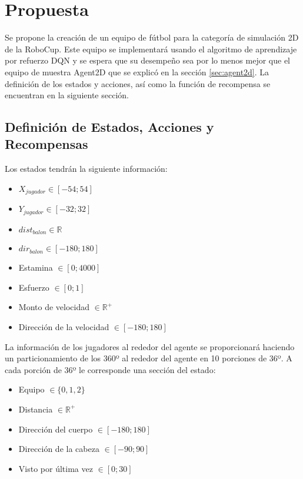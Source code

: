 \chapter{Propuesta}

Se propone la creación de un equipo de fútbol para la categoría de simulación 2D de la RoboCup. Este equipo se implementará usando el algoritmo de aprendizaje por refuerzo \ac{DQN} y se espera que su desempeño sea por lo menos mejor que el equipo de muestra Agent2D que se explicó en la sección \ref{sec:agent2d}. La definición de los estados y acciones, así como la función de recompensa se encuentran en la siguiente sección.

\section{Definición de Estados, Acciones y Recompensas}

Los estados tendrán la siguiente información:

\begin{itemize}
\item $X_{jugador} \in [-54; 54]$ 
\item $Y_{jugador} \in [-32; 32]$
\item $dist_{balon} \in \mathbb{R}$
\item $dir_{balon} \in [-180; 180]$
\item Estamina $ \in [0; 4000]$
\item Esfuerzo $ \in [0; 1]$
\item Monto de velocidad $ \in \mathbb{R}^+$
\item Dirección de la velocidad $ \in [-180; 180]$
\end{itemize}

La información de los jugadores al rededor del agente se proporcionará haciendo un particionamiento de los 360º al rededor del agente en 10 porciones de 36º. A cada porción de 36º le corresponde una sección del estado:

\begin{itemize}
\item Equipo $ \in \{0, 1, 2\}$
\item Distancia $ \in \mathbb{R}^+$
\item Dirección del cuerpo $ \in [-180; 180]$
\item Dirección de la cabeza $ \in [-90; 90]$
\item Visto por última vez $ \in [0; 30]$
\end{itemize}

